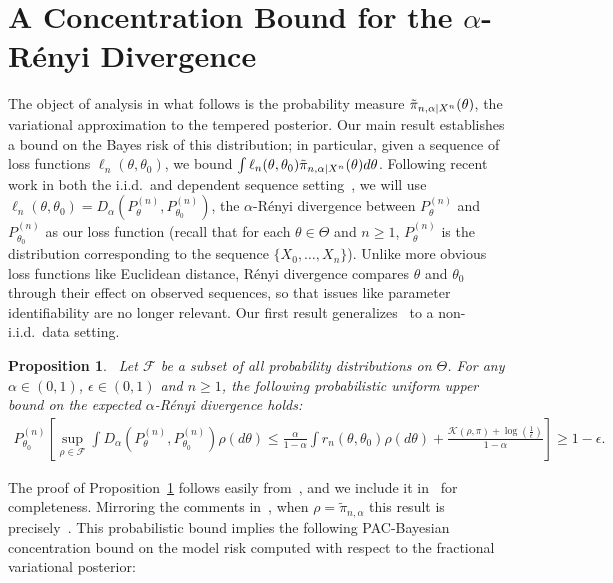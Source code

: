 \documentclass[11pt]{amsart}
\newcommand{\alpren}{$\alpha$-R\'enyi }
\newtheorem{proposition}{Proposition}[section]
\newenvironment{customlemma}[1]
  {\renewcommand\theinnercustomlemma{#1}\innercustomlemma}
  {\endinnercustomlemma}
\begin{document}
\section{A Concentration Bound for the $\alpha$-R\'enyi Divergence}\label{section:conc bound}
The object of analysis in what follows is the probability measure $ \Tilde{\pi}_{n,\alpha|X^n}(\theta)$, the variational approximation to the tempered posterior.
Our main result establishes a bound on the Bayes risk of this distribution; in particular, given a sequence of loss functions $\ell_n(\theta,\theta_0)$, we bound $\int \ell_n(\theta,\theta_0) \Tilde{\pi}_{n,\alpha|X^n}(\theta) d\theta$.
Following recent work %
in both the i.i.d.\ and dependent sequence setting~\cite{pati,pierre,bhatta}, we will use $\ell_n(\theta,\theta_0) = D_{\alpha}(P^{(n)}_{\theta},P^{(n)}_{\theta_0})$, the $\alpha$-R\'enyi divergence between $P^{(n)}_\theta$ and $P^{(n)}_{\theta_0}$ as our loss function 
(recall that for each $\theta \in \Theta$ and $n \ge 1$, $P_\theta^{(n)}$ is the distribution corresponding to the sequence $\{X_0,\ldots,X_n\}$). 
Unlike more obvious loss functions like Euclidean distance, R\'enyi divergence compares $\theta$ and $\theta_0$ through their effect on observed sequences, so that issues like parameter identifiability are no longer relevant.
Our first result generalizes~\cite[Theorem 2.1]{pierre} to a non-i.i.d.\ data setting.  

\begin{proposition}~\label{prop:1}
Let $\mathcal{F}$ be a subset of all probability distributions on $\Theta$. For any $\alpha\in (0,1)$, $\epsilon \in (0,1)$ and $n \ge 1$, the following probabilistic uniform upper bound on the expected \alpren divergence holds:
\begin{align}
    P^{(n)}_{\theta_0} \left[ \sup_{\rho \in \mathcal F}\int D_{\alpha}(P^{(n)}_{\theta},P^{(n)}_{\theta_0})\rho(d\theta)\leq \frac{\alpha}{1-\alpha}\int r_n(\theta,\theta_0)\rho(d\theta) + \frac{\mathcal{K}(\rho,\pi) + \log(\frac{1}{\epsilon}) }{1-\alpha} \right]\geq 1-\epsilon.
\end{align}
\end{proposition}
The proof of Proposition~\ref{prop:1} follows easily from~\cite{pierre}, and we include it in~ for completeness. Mirroring the comments in~\cite{pierre}, when $\rho = \tilde \pi_{n,\alpha}$ this result is precisely~\cite[Theorem 3.5]{pati}. This probabilistic bound implies the following PAC-Bayesian concentration bound on the model risk computed with respect to the fractional variational posterior:
\end{document}
